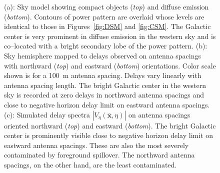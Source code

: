 \documentclass[preprint2,iop,numberedappendix]{emulateapj}
\begin{document}
\begin{figure}[htb]
\centering
{}
\caption{(a): Sky model showing compact objects ({\it top}) and diffuse emission ({\it bottom}). Contours of power pattern are overlaid whose levels are identical to those in Figures~\ref{fig:DSM} and \ref{fig:CSM}. The Galactic center is very prominent in diffuse emission in the western sky and is co--located with a bright secondary lobe of the power pattern. (b): Sky hemisphere mapped to delays observed on antenna spacings with northward ({\it top}) and eastward ({\it bottom}) orientations. Color scale shown is for a 100~m antenna spacing. Delays vary linearly with antenna spacing length. The bright Galactic center in the western sky is recorded at zero delays in northward antenna spacings and close to negative horizon delay limit on eastward antenna spacings. (c): Simulated delay spectra $|V_\eta(\overline{\mathbf{x}},\eta)|$ on antenna spacings oriented northward ({\it top}) and eastward ({\it bottom}). The bright Galactic center is prominently visible close to negative horizon delay limit on eastward antenna spacings. These are also the most severely contaminated by foreground spillover. The northward antenna spacings, on the other hand, are the least contaminated.}
\label{fig:breakup}
\end{figure}
\end{document}
